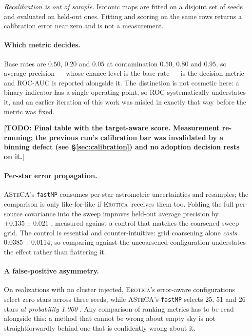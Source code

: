 \documentclass{aa}
\newcommand{\TODO}[1]{\textbf{[TODO: #1]}}
\newcommand{\erotica}{\textsc{Erotica}}
\newcommand{\asteca}{\textsc{ASteCA}}
\begin{document}
\emph{Recalibration is out of sample.} Isotonic maps are fitted on a disjoint set of seeds and
evaluated on held-out ones. Fitting and scoring on the same rows returns a calibration error near
zero and is not a measurement.

\paragraph{Which metric decides.} Base rates are $0.50$, $0.20$ and $0.05$ at contamination
$0.50$, $0.80$ and $0.95$, so average precision --- whose chance level is the base rate --- is the
decision metric and ROC-AUC is reported alongside it. The distinction is not cosmetic here: a
binary indicator has a single operating point, so ROC systematically understates it, and an
earlier iteration of this work was misled in exactly that way before the metric was fixed.

\TODO{Final table with the target-aware score. Measurement re-running; the previous run's
calibration bar was invalidated by a binning defect (see \S\ref{sec:calibration}) and no adoption
decision rests on it.}

\paragraph{Per-star error propagation.}
\asteca's \texttt{fastMP} consumes per-star astrometric uncertainties and resamples; the
comparison is only like-for-like if \erotica\ receives them too. Folding the full per-source
covariance into the sweep improves held-out average precision by $+0.135 \pm 0.021$
, measured against a control that matches the coarsened sweep grid. The control is essential and
counter-intuitive: grid coarsening alone \emph{costs} $0.0385 \pm 0.0114$, so comparing against
the uncoarsened configuration understates the effect rather than flattering it.

\paragraph{A false-positive asymmetry.}
On realizations with no cluster injected, \erotica's error-aware configurations select zero stars
across three seeds, while \asteca's \texttt{fastMP} selects 25, 51 and 26 stars \emph{at
probability 1.000}
. Any comparison of ranking metrics has to be read alongside this: a method that cannot be wrong
about empty sky is not straightforwardly behind one that is confidently wrong about it.
\end{document}
